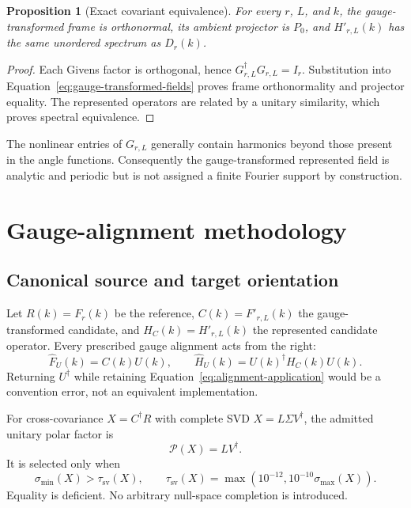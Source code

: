 \documentclass[11pt]{article}
\newtheorem{proposition}{Proposition}
\begin{document}
\begin{proposition}[Exact covariant equivalence]
For every $r$, $L$, and $k$, the gauge-transformed frame is orthonormal, its ambient projector is
$P_0$, and $H'_{r,L}(k)$ has the same unordered spectrum as $D_r(k)$.
\end{proposition}

\begin{proof}
Each Givens factor is orthogonal, hence $G_{r,L}^\dagger G_{r,L}=I_r$. Substitution into
Equation~\eqref{eq:gauge-transformed-fields} proves frame orthonormality and projector equality.
The represented operators are related by a unitary similarity, which proves spectral
equivalence.
\end{proof}

The nonlinear entries of $G_{r,L}$ generally contain harmonics beyond those present in
the angle functions. Consequently the gauge-transformed represented field is analytic and
periodic but is not assigned a finite Fourier support by construction.

\section{Gauge-alignment methodology}
\label{sec:alignment}

\subsection{Canonical source and target orientation}

Let $R(k)=F_r(k)$ be the reference, $C(k)=F'_{r,L}(k)$ the gauge-transformed candidate, and
$H_C(k)=H'_{r,L}(k)$ the represented candidate operator. Every prescribed gauge
alignment acts from the right:
\begin{equation}
 \widehat F_U(k)=C(k)U(k),
 \qquad
 \widehat H_U(k)=U(k)^\dagger H_C(k)U(k).
 \label{eq:alignment-application}
\end{equation}
Returning $U^\dagger$ while retaining Equation~\eqref{eq:alignment-application} would be
a convention error, not an equivalent implementation.

For cross-covariance $X=C^\dagger R$ with complete SVD
$X=L\Sigma V^\dagger$, the admitted unitary polar factor is
\begin{equation}
 \mathcal P(X)=LV^\dagger.
 \label{eq:polar-factor}
\end{equation}
It is selected only when
\begin{equation}
 \sigma_{\min}(X)>\tau_{\mathrm{sv}}(X),
 \qquad
 \tau_{\mathrm{sv}}(X)=\max(10^{-12},10^{-10}\sigma_{\max}(X)).
 \label{eq:rank-gate}
\end{equation}
Equality is deficient. No arbitrary null-space completion is introduced.
\end{document}
